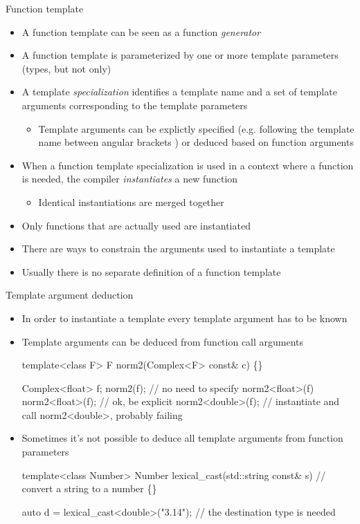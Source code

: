 \begin{frame}{Function template \insertcontinuationtext}
  \begin{itemize}
  \item A function template can be seen as a function \textit{generator}
  \item A function template is parameterized by one or more template parameters
    (types, but not only)
  \item A template \textit{specialization} identifies a template name and a set
    of template arguments corresponding to the template parameters
    \begin{itemize}
    \item Template arguments can be explictly specified (e.g. following the
      template name between angular brackets \code{<>}) or deduced based on
      function arguments
    \end{itemize}
  \item When a function template specialization is used in a context where a
    function is needed, the compiler \textit{instantiates} a new function
    \begin{itemize}
    \item Identical instantiations are merged together
    \end{itemize}
  \item Only functions that are actually used are instantiated
  \item There are ways to constrain the arguments used to instantiate a template
  \item Usually there is no separate definition of a function template
  \end{itemize}
\end{frame}

\begin{frame}[fragile]{Template argument deduction}

  \begin{itemize}
  \item In order to instantiate a template every template argument has to be
    known
  \item Template arguments can be deduced from function call arguments
    \begin{codeblock}
template<class F> F norm2(Complex<F> const& c) \{\ddd\}

Complex<float> f;
norm2(f);          // no need to specify norm2<float>(f)
norm2<float>(f);   // ok, be explicit
norm2<double>(f);  // instantiate and call norm2<double>, probably failing\end{codeblock}

  \item Sometimes it's not possible to deduce all template arguments from function
    parameters
    \begin{codeblock}
template<class Number>
Number lexical_cast(std::string const& s) // convert a string to a number
\{\ddd\}

auto d = lexical_cast<double>("3.14"); // the destination type is needed\end{codeblock}
  \end{itemize}
\end{frame}

